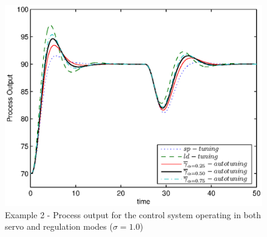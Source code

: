 \begin{figure}[htb!]
    \begin{center}
        \includegraphics[width=0.7\linewidth]{y2outps4.eps}
        \caption{Example 2 - Process output for the control system operating in both servo and regulation modes ($\sigma=1.0$)}
        \label{y2_out4}
    \end{center}
\end{figure}

